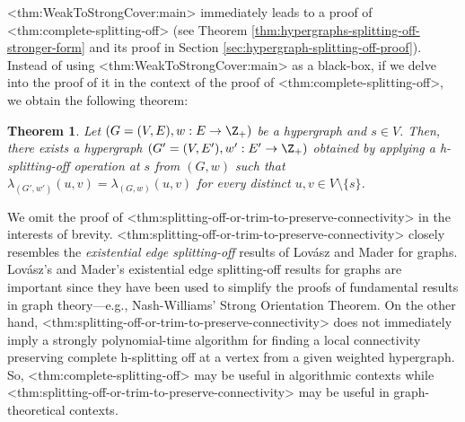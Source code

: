 \documentclass{article}
\def\Cref#1{<#1>}%
\newtheorem{theorem}{Theorem}[section]
\begin{document}
\Cref{thm:WeakToStrongCover:main} immediately leads to  a proof of \Cref{thm:complete-splitting-off} (see Theorem \ref{thm:hypergraphs-splitting-off-stronger-form} and its proof in Section \ref{sec:hypergraph-splitting-off-proof}). Instead of using \Cref{thm:WeakToStrongCover:main} as a black-box, if we delve into the proof of it in the context of the proof of \Cref{thm:complete-splitting-off}, we obtain the following theorem: 

\begin{theorem}\label{thm:splitting-off-or-trim-to-preserve-connectivity}
    Let $(G=(V, E), w: E\rightarrow \Z_+)$ be a hypergraph and $s\in V$. Then, there exists a hypergraph $(G'=(V, E'), w': E'\rightarrow \Z_+)$ obtained 
    by applying a h-splitting-off operation at $s$ from $(G, w)$ 
    such that $\lambda_{(G', w')}(u, v)=\lambda_{(G, w)}(u, v)$ for every distinct $u, v\in V\setminus \{s\}$. 
\end{theorem}
We omit the proof of \Cref{thm:splitting-off-or-trim-to-preserve-connectivity} in the interests of brevity. 
\Cref{thm:splitting-off-or-trim-to-preserve-connectivity} closely resembles the \emph{existential edge splitting-off} results of Lov\'{a}sz \cite{Lov74, Lovasz-problems-book} and Mader \cite{Mad78} for graphs. Lov\'{a}sz's and Mader's  existential edge splitting-off results for graphs are important since they have been used to simplify the proofs of fundamental results in graph theory---e.g., Nash-Williams' Strong Orientation Theorem. 
On the other hand, \Cref{thm:splitting-off-or-trim-to-preserve-connectivity} does not immediately imply a strongly polynomial-time algorithm for finding a local connectivity preserving complete h-splitting off at a vertex from a given weighted hypergraph. So, \Cref{thm:complete-splitting-off} may be useful in algorithmic contexts while \Cref{thm:splitting-off-or-trim-to-preserve-connectivity} may be useful in graph-theoretical contexts. 
\end{document}
